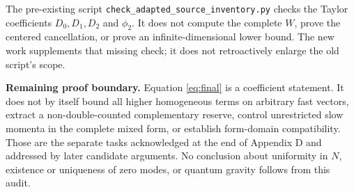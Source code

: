 \documentclass[11pt,letterpaper]{article}
\begin{document}
The pre-existing script \texttt{check\_adapted\_source\_inventory.py} checks the Taylor coefficients $D_0,D_1,D_2$ and $\phi_2$. It does not compute the complete $W$, prove the centered cancellation, or prove an infinite-dimensional lower bound. The new work supplements that missing check; it does not retroactively enlarge the old script's scope.

\textbf{Remaining proof boundary.} Equation \eqref{eq:final} is a coefficient statement. It does not by itself bound all higher homogeneous terms on arbitrary fast vectors, extract a non-double-counted complementary reserve, control unrestricted slow momenta in the complete mixed form, or establish form-domain compatibility. Those are the separate tasks acknowledged at the end of Appendix D and addressed by later candidate arguments. No conclusion about uniformity in $N$, existence or uniqueness of zero modes, or quantum gravity follows from this audit.
\end{document}

